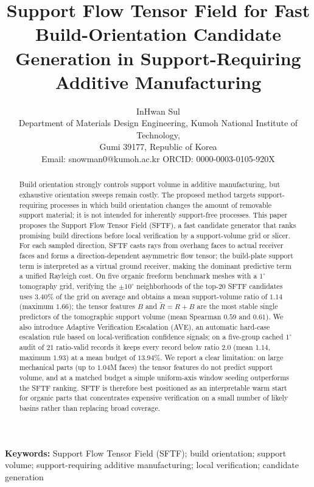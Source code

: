 \documentclass[12pt]{article}
\title{Support Flow Tensor Field for Fast Build-Orientation Candidate Generation
in Support-Requiring Additive Manufacturing}
\author{InHwan Sul\\
\small Department of Materials Design Engineering, Kumoh National Institute of Technology,\\
\small Gumi 39177, Republic of Korea\\
\small Email: snowman0@kumoh.ac.kr \quad ORCID: 0000-0003-0105-920X}
\date{}
\begin{document}
\maketitle

\begin{abstract}
\noindent
Build orientation strongly controls support volume in additive manufacturing, but
exhaustive orientation sweeps remain costly. The proposed method targets
support-requiring processes in which build orientation changes the amount of
removable support material; it is not intended for inherently support-free
processes. This paper proposes the Support Flow Tensor Field (SFTF), a fast
candidate generator that ranks promising build directions before local
verification by a support-volume grid or slicer. For each sampled direction, SFTF
casts rays from overhang faces to actual receiver faces and forms a
direction-dependent asymmetric flow tensor; the build-plate support term is
interpreted as a virtual ground receiver, making the dominant predictive term a
unified Rayleigh cost. On five organic freeform benchmark meshes with a $1^\circ$
tomography grid, verifying the $\pm 10^\circ$ neighborhoods of the top-$20$ SFTF
candidates uses $3.40\%$ of the grid on average and obtains a mean support-volume
ratio of $1.14$ (maximum $1.66$); the tensor features $B$ and $\tilde R=R+B$ are the
most stable single predictors of the tomographic support volume (mean Spearman
$0.59$ and $0.61$). We also introduce Adaptive Verification Escalation (AVE), an
automatic hard-case escalation rule based on local-verification confidence signals;
on a five-group cached $1^\circ$ audit of $21$ ratio-valid records it keeps every
record below ratio $2.0$ (mean $1.14$, maximum $1.93$) at a mean budget of
$13.94\%$. We report a clear limitation: on large mechanical parts (up to $1.04$M
faces) the tensor features do not predict support volume, and at a matched budget a
simple uniform-axis window seeding outperforms the SFTF ranking. SFTF is therefore
best positioned as an interpretable warm start for organic parts that concentrates
expensive verification on a small number of likely basins rather than replacing
broad coverage.
\end{abstract}

\noindent\textbf{Keywords:} Support Flow Tensor Field (SFTF); build orientation;
support volume; support-requiring additive manufacturing; local verification;
candidate generation

\end{document}

